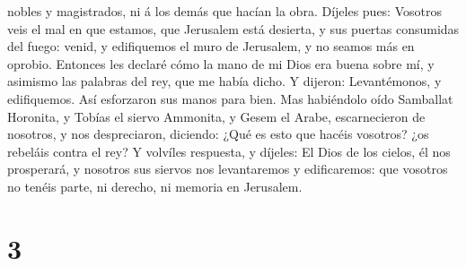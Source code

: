 nobles y magistrados, ni á los demás que hacían la obra. 
Díjeles pues: Vosotros veis el mal en que estamos, que Jerusalem está
desierta, y sus puertas consumidas del fuego: venid, y edifiquemos el
muro de Jerusalem, y no seamos más en oprobio.  Entonces
les declaré cómo la mano de mi Dios era buena sobre mí, y asimismo las
palabras del rey, que me había dicho. Y dijeron: Levantémonos, y
edifiquemos. Así esforzaron sus manos para bien.  Mas
habiéndolo oído Samballat Horonita, y Tobías el siervo Ammonita, y Gesem
el Arabe, escarnecieron de nosotros, y nos despreciaron, diciendo: ¿Qué
es esto que hacéis vosotros? ¿os rebeláis contra el rey?  Y
volvíles respuesta, y díjeles: El Dios de los cielos, él nos prosperará,
y nosotros sus siervos nos levantaremos y edificaremos: que vosotros no
tenéis parte, ni derecho, ni memoria en Jerusalem.

\hypertarget{section-2}{%
\section{3}\label{section-2}}

